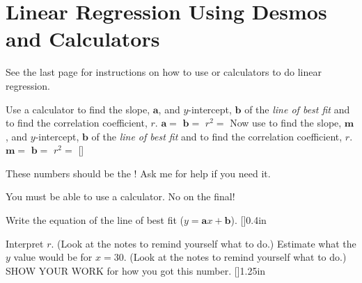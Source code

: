 \section*{Linear Regression Using Desmos and Calculators}

See the last page for instructions on how to use \myDesmos or \myTi calculators
to do linear regression.

\myProblemsWithContent
{
    Use a \myTi calculator to find the slope, $\bm{a}$, and $y$-intercept, $\bm{b}$ of the {\itshape line of best fit} 
    and to find the correlation coefficient, $r$.\newline \newline
    $\bm{a} = $ \underline{\hspace{0.5in}} 
    \hfill 
    $\bm{b} = $ \underline{\hspace{0.5in}} 
    \hfill 
    $r^2 = $ \underline{\hspace{0.5in}}
}
{
    Now use \myDesmos to find the slope, $\bm{m}$, and $y$-intercept, $\bm{b}$ of the {\itshape line of best fit} 
    and to find the correlation coefficient, $r$.\newline \newline
    $\bm{m} = $ \underline{\hspace{0.5in}} 
    \hfill 
    $\bm{b} = $ \underline{\hspace{0.5in}} 
    \hfill 
    $r^2 = $ \underline{\hspace{0.5in}}
}
[\small]

\vfill 

\begin{tcbraster}[
    raster columns = 2,
    raster equal height,
    colback=white,
    raster left skip = 0.2in, raster right skip = 0.2in,
    raster column skip = 0.2in,
]
\begin{tcolorbox}
    These numbers should be the !
    Ask me for help if you need it.
\end{tcolorbox}
\begin{tcolorbox}
    \centering
    You must be able to use a 
    \myTi calculator. 
    {
        \newline
        \LARGE
        No \myDesmos on the final!
    }
\end{tcolorbox}
\end{tcbraster}

\vfill 
\newpage
\myWideProblem
{
    Write the equation of the line of best fit ($y = \bm{a}x + \bm{b}$).
}[\small]{0.4in}

\myProblems
{
    Interpret $r$.
    (Look at the  notes to remind yourself what to do.)
}
{
    Estimate what the $y$ value would be for $x=30$.
    (Look at the  notes to remind yourself what to do.)\\[1\onelineskip]
    SHOW YOUR WORK for how you got this number.
}[\small]{1.25in}